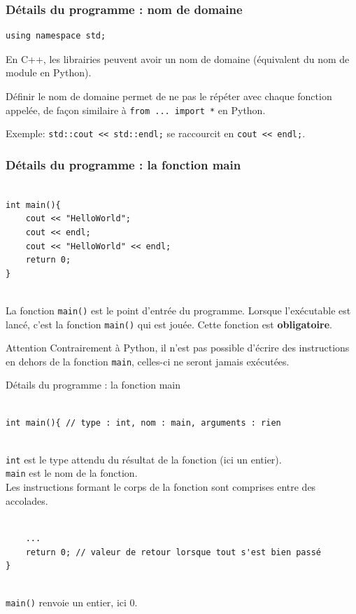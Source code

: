 \begin{frame}[fragile]
    \frametitle{Détails du programme : nom de domaine}
    \begin{verbatim}
using namespace std;
    \end{verbatim}

    En C++, les librairies peuvent avoir un nom de domaine (équivalent du nom de module en Python).

    Définir le nom de domaine permet de ne pas le répéter avec chaque fonction appelée, de façon similaire à \texttt{from ... import *} en Python.
    
    Exemple: \texttt{std::cout << std::endl;} se raccourcit en \texttt{cout << endl;}.

\end{frame}

\begin{frame}[fragile]
    \frametitle{Détails du programme : la fonction main}
    \begin{verbatim}
        
int main(){
    cout << "HelloWorld";
    cout << endl;
    cout << "HelloWorld" << endl;
    return 0;
}
        
    \end{verbatim}

    La fonction \texttt{main()} est le point d'entrée du programme. Lorsque l'exécutable est lancé, c'est la fonction \texttt{main()} qui est jouée. Cette fonction est \textbf{obligatoire}.
    
    \begin{alertblock}{Attention}
    Contrairement à Python, il n'est pas possible d'écrire des instructions en dehors de la fonction \texttt{main}, celles-ci ne seront jamais exécutées.
    \end{alertblock}
\end{frame}


\begin{frame}[fragile]{Détails du programme : la fonction main}

    \begin{verbatim}
        
int main(){ // type : int, nom : main, arguments : rien
        
    \end{verbatim}

    \texttt{int} est le type attendu du résultat de la fonction (ici un entier).\\
    \texttt{main} est le nom de la fonction.\\
    Les instructions formant le corps de la fonction sont comprises entre des accolades.

    \begin{verbatim}
        
    ...
    return 0; // valeur de retour lorsque tout s'est bien passé
}
        
    \end{verbatim}
    \texttt{main()} renvoie un entier, ici $0$.
\end{frame}


